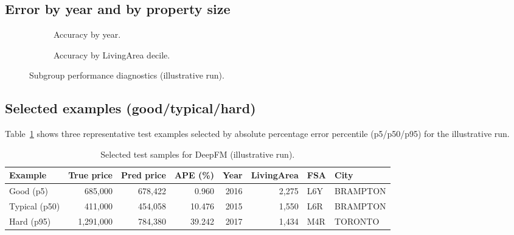 \documentclass[11pt]{article}
\begin{document}
\subsection{Error by year and by property size}
\begin{figure}[h]
\centering
\begin{subfigure}{0.49\linewidth}
\centering
{}
\caption{Accuracy by year.}
\end{subfigure}
\hfill
\begin{subfigure}{0.49\linewidth}
\centering
{}
\caption{Accuracy by LivingArea decile.}
\end{subfigure}
\caption{Subgroup performance diagnostics (illustrative run).}
\label{fig:deepfm-subgroups}
\end{figure}

\subsection{Selected examples (good/typical/hard)}
Table~\ref{tab:deepfm-examples} shows three representative test examples selected by absolute percentage error percentile (p5/p50/p95) for the illustrative run.

\begin{table}[h]
\centering
\small
\begin{tabularx}{\linewidth}{@{}lrrrrrll@{}}
\toprule
Example & True price & Pred price & APE (\%) & Year & LivingArea & FSA & City \\
\midrule
Good (p5) & 685{,}000 & 678{,}422 & 0.960 & 2016 & 2{,}275 & L6Y & BRAMPTON \\
Typical (p50) & 411{,}000 & 454{,}058 & 10.476 & 2015 & 1{,}550 & L6R & BRAMPTON \\
Hard (p95) & 1{,}291{,}000 & 784{,}380 & 39.242 & 2017 & 1{,}434 & M4R & TORONTO \\
\bottomrule
\end{tabularx}
\caption{Selected test samples for DeepFM (illustrative run).}
\label{tab:deepfm-examples}
\end{table}
\end{document}
